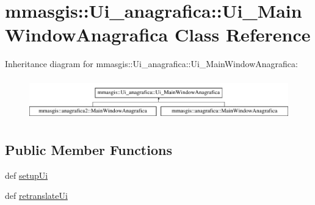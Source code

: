 \hypertarget{classmmasgis_1_1Ui__anagrafica_1_1Ui__MainWindowAnagrafica}{
\section{mmasgis::Ui\_\-anagrafica::Ui\_\-MainWindowAnagrafica Class Reference}
\label{classmmasgis_1_1Ui__anagrafica_1_1Ui__MainWindowAnagrafica}
}
Inheritance diagram for mmasgis::Ui\_\-anagrafica::Ui\_\-MainWindowAnagrafica:\begin{figure}[H]
\begin{center}
\leavevmode
\includegraphics[height=1.800643cm]{classmmasgis_1_1Ui__anagrafica_1_1Ui__MainWindowAnagrafica}
\end{center}
\end{figure}
\subsection*{Public Member Functions}
\begin{DoxyCompactItemize}
\item 
def \hyperlink{classmmasgis_1_1Ui__anagrafica_1_1Ui__MainWindowAnagrafica_a17da3e151269e06d8d69d6baeea99912}{setupUi}
\item 
def \hyperlink{classmmasgis_1_1Ui__anagrafica_1_1Ui__MainWindowAnagrafica_a9f0121e52190b4e20bb203aea20b0550}{retranslateUi}
\end{DoxyCompactItemize}

